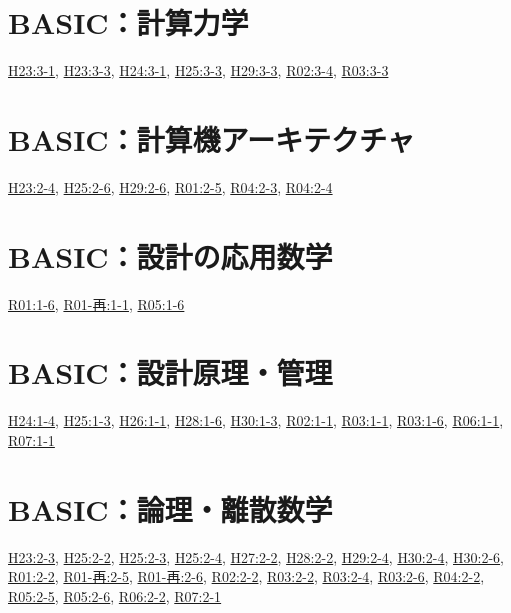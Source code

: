 \section{BASIC：計算力学}
\hyperref[q:h23-reg-basic-3-1]{H23:3-1}, \hyperref[q:h23-reg-basic-3-3]{H23:3-3}, \hyperref[q:h24-reg-basic-3-1]{H24:3-1}, \hyperref[q:h25-reg-basic-3-3]{H25:3-3}, \hyperref[q:h29-reg-basic-3-3]{H29:3-3}, \hyperref[q:r02-reg-basic-3-4]{R02:3-4}, \hyperref[q:r03-reg-basic-3-3]{R03:3-3}
\section{BASIC：計算機アーキテクチャ}
\hyperref[q:h23-reg-basic-2-4]{H23:2-4}, \hyperref[q:h25-reg-basic-2-6]{H25:2-6}, \hyperref[q:h29-reg-basic-2-6]{H29:2-6}, \hyperref[q:r01-reg-basic-2-5]{R01:2-5}, \hyperref[q:r04-reg-basic-2-3]{R04:2-3}, \hyperref[q:r04-reg-basic-2-4]{R04:2-4}
\section{BASIC：設計の応用数学}
\hyperref[q:r01-reg-basic-1-6]{R01:1-6}, \hyperref[q:r01-ret-basic-1-1]{R01-再:1-1}, \hyperref[q:r05-reg-basic-1-6]{R05:1-6}
\section{BASIC：設計原理・管理}
\hyperref[q:h24-reg-basic-1-4]{H24:1-4}, \hyperref[q:h25-reg-basic-1-3]{H25:1-3}, \hyperref[q:h26-reg-basic-1-1]{H26:1-1}, \hyperref[q:h28-reg-basic-1-6]{H28:1-6}, \hyperref[q:h30-reg-basic-1-3]{H30:1-3}, \hyperref[q:r02-reg-basic-1-1]{R02:1-1}, \hyperref[q:r03-reg-basic-1-1]{R03:1-1}, \hyperref[q:r03-reg-basic-1-6]{R03:1-6}, \hyperref[q:r06-reg-basic-1-1]{R06:1-1}, \hyperref[q:r07-reg-basic-1-1]{R07:1-1}
\section{BASIC：論理・離散数学}
\hyperref[q:h23-reg-basic-2-3]{H23:2-3}, \hyperref[q:h25-reg-basic-2-2]{H25:2-2}, \hyperref[q:h25-reg-basic-2-3]{H25:2-3}, \hyperref[q:h25-reg-basic-2-4]{H25:2-4}, \hyperref[q:h27-reg-basic-2-2]{H27:2-2}, \hyperref[q:h28-reg-basic-2-2]{H28:2-2}, \hyperref[q:h29-reg-basic-2-4]{H29:2-4}, \hyperref[q:h30-reg-basic-2-4]{H30:2-4}, \hyperref[q:h30-reg-basic-2-6]{H30:2-6}, \hyperref[q:r01-reg-basic-2-2]{R01:2-2}, \hyperref[q:r01-ret-basic-2-5]{R01-再:2-5}, \hyperref[q:r01-ret-basic-2-6]{R01-再:2-6}, \hyperref[q:r02-reg-basic-2-2]{R02:2-2}, \hyperref[q:r03-reg-basic-2-2]{R03:2-2}, \hyperref[q:r03-reg-basic-2-4]{R03:2-4}, \hyperref[q:r03-reg-basic-2-6]{R03:2-6}, \hyperref[q:r04-reg-basic-2-2]{R04:2-2}, \hyperref[q:r05-reg-basic-2-5]{R05:2-5}, \hyperref[q:r05-reg-basic-2-6]{R05:2-6}, \hyperref[q:r06-reg-basic-2-2]{R06:2-2}, \hyperref[q:r07-reg-basic-2-1]{R07:2-1}
